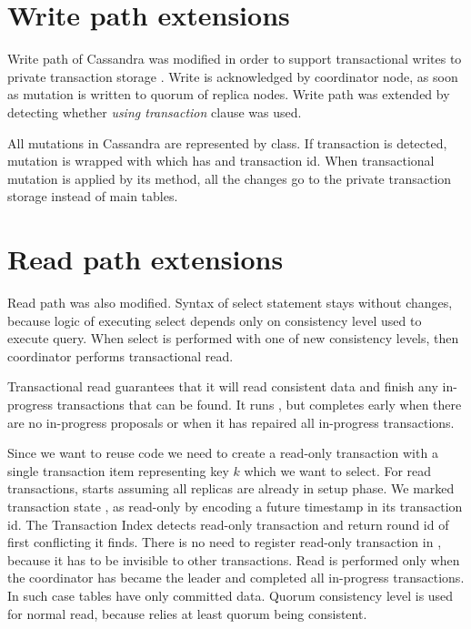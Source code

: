 \section{Write path extensions}
Write path of Cassandra \cite{CassandraWritePath} was modified in order to support transactional writes to private transaction storage \txStorage.
Write is acknowledged by coordinator node, as soon as mutation  is written to quorum of replica nodes.
Write path was extended by detecting whether \emph{using transaction} clause was used. 

All mutations in Cassandra are represented by  class. If transaction \transaction is detected, mutation is wrapped with  which has  and transaction id.
When transactional mutation is applied by its  method, all the changes go to the private transaction storage instead of main tables.

\section{Read path extensions}
Read path \cite{CassandraReadPath} was also modified. 
Syntax of select statement stays without changes, because logic of executing select depends only on consistency level used to execute query. When select is performed with one of new consistency levels, then coordinator performs transactional read.


Transactional read guarantees that it will read consistent data and finish any in-progress transactions that can be found. It runs \mpt, but completes early when there are no in-progress proposals or when it has repaired all in-progress transactions.


Since we want to reuse \mpt code we need to create a read-only transaction with a single transaction item \txItem representing key $k$ which we want to select. For read transactions, \mpt starts assuming all replicas are already in setup phase. 
We marked transaction state \txState, as read-only \txState by encoding a future timestamp in its transaction id.
The Transaction Index \txIndex detects read-only transaction and return \paxos round id \paxosRoundId of first conflicting \txState it finds. There is no need to register read-only transaction in \txIndex, because it has to be invisible to other transactions.
Read is performed only when the coordinator has became the leader and completed all in-progress transactions. In such case tables have only committed data. Quorum consistency level is used for normal read, because \mpt relies at least quorum being consistent.

